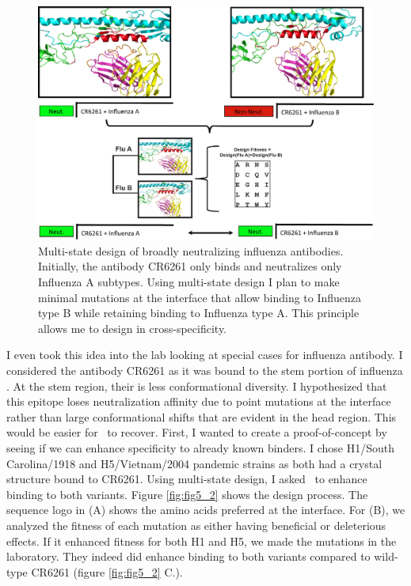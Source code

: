 \begin{figure}[!t]
   \centering
   \includegraphics[width=\columnwidth]{images/chapter5/figure5_1.pdf}
   \caption[Multi-State Design of Broadly Neutralizing Influenza Antibodies]{Multi-state design of broadly neutralizing influenza antibodies. Initially, the antibody CR6261 only binds and neutralizes only Influenza A subtypes. Using multi-state design I plan to make minimal mutations at the interface that allow binding to Influenza type B while retaining binding to Influenza type A. This principle allows me to design in cross-specificity.}
       \label{fig:fig5_1}
\end{figure}


I even took this idea into the lab looking at special cases for influenza antibody. I considered the antibody CR6261 as it was bound to the stem portion of influenza \citep{Corti:2011ku}. At the stem region, their is less conformational diversity. I hypothesized that this epitope loses neutralization affinity due to point mutations at the interface rather than large conformational shifts that are evident in the head region. This would be easier for \rosettadesign~to recover. First, I wanted to create a proof-of-concept by seeing if we can enhance specificity to already known binders. I chose H1/South Carolina/1918 and H5/Vietnam/2004 pandemic strains as both had a crystal structure bound to CR6261. Using multi-state design, I asked \rosettadesign~to enhance binding to both variants. Figure \ref{fig:fig5_2} shows the design process. The sequence logo in (A) shows the amino acids preferred at the interface. For (B), we analyzed the fitness of each mutation as either having beneficial or deleterious effects. If it enhanced fitness for both H1 and H5, we made the mutations in the laboratory. They indeed did enhance binding to both variants compared to wild-type CR6261 (figure \ref{fig:fig5_2} C.).

